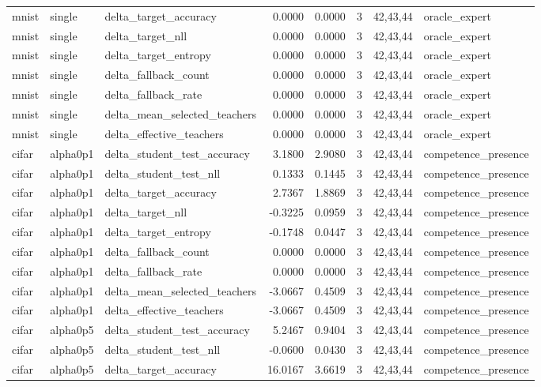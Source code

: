 \begin{tabular}{lllrrrll}
mnist & single & delta\_target\_accuracy & 0.0000 & 0.0000 & 3 & 42,43,44 & oracle\_expert \\
mnist & single & delta\_target\_nll & 0.0000 & 0.0000 & 3 & 42,43,44 & oracle\_expert \\
mnist & single & delta\_target\_entropy & 0.0000 & 0.0000 & 3 & 42,43,44 & oracle\_expert \\
mnist & single & delta\_fallback\_count & 0.0000 & 0.0000 & 3 & 42,43,44 & oracle\_expert \\
mnist & single & delta\_fallback\_rate & 0.0000 & 0.0000 & 3 & 42,43,44 & oracle\_expert \\
mnist & single & delta\_mean\_selected\_teachers & 0.0000 & 0.0000 & 3 & 42,43,44 & oracle\_expert \\
mnist & single & delta\_effective\_teachers & 0.0000 & 0.0000 & 3 & 42,43,44 & oracle\_expert \\
cifar & alpha0p1 & delta\_student\_test\_accuracy & 3.1800 & 2.9080 & 3 & 42,43,44 & competence\_presence \\
cifar & alpha0p1 & delta\_student\_test\_nll & 0.1333 & 0.1445 & 3 & 42,43,44 & competence\_presence \\
cifar & alpha0p1 & delta\_target\_accuracy & 2.7367 & 1.8869 & 3 & 42,43,44 & competence\_presence \\
cifar & alpha0p1 & delta\_target\_nll & -0.3225 & 0.0959 & 3 & 42,43,44 & competence\_presence \\
cifar & alpha0p1 & delta\_target\_entropy & -0.1748 & 0.0447 & 3 & 42,43,44 & competence\_presence \\
cifar & alpha0p1 & delta\_fallback\_count & 0.0000 & 0.0000 & 3 & 42,43,44 & competence\_presence \\
cifar & alpha0p1 & delta\_fallback\_rate & 0.0000 & 0.0000 & 3 & 42,43,44 & competence\_presence \\
cifar & alpha0p1 & delta\_mean\_selected\_teachers & -3.0667 & 0.4509 & 3 & 42,43,44 & competence\_presence \\
cifar & alpha0p1 & delta\_effective\_teachers & -3.0667 & 0.4509 & 3 & 42,43,44 & competence\_presence \\
cifar & alpha0p5 & delta\_student\_test\_accuracy & 5.2467 & 0.9404 & 3 & 42,43,44 & competence\_presence \\
cifar & alpha0p5 & delta\_student\_test\_nll & -0.0600 & 0.0430 & 3 & 42,43,44 & competence\_presence \\
cifar & alpha0p5 & delta\_target\_accuracy & 16.0167 & 3.6619 & 3 & 42,43,44 & competence\_presence \\

\end{tabular}
